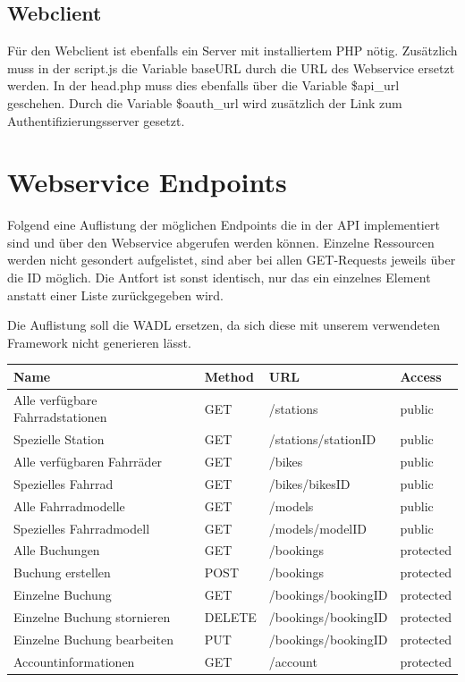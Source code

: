 \section{Webclient}
Für den Webclient ist ebenfalls ein Server mit installiertem PHP nötig. Zusätzlich muss in der script.js die Variable baseURL durch die URL des Webservice ersetzt werden. In der head.php muss dies ebenfalls über die Variable \$api\_url geschehen. Durch die Variable \$oauth\_url wird zusätzlich der Link zum Authentifizierungsserver gesetzt.

\chapter{Webservice Endpoints}

Folgend eine Auflistung der möglichen Endpoints die in der API implementiert sind und über den Webservice abgerufen werden können. Einzelne Ressourcen werden nicht gesondert aufgelistet, sind aber bei allen GET-Requests jeweils über die ID möglich. Die Antfort ist sonst identisch, nur das ein einzelnes Element anstatt einer Liste zurückgegeben wird.

Die Auflistung soll die WADL ersetzen, da sich diese mit unserem verwendeten Framework nicht generieren lässt.

\begin{tabularx}{\columnwidth}{|X|p{1.5cm}|X|p{1.5cm}|}
	\hline
	Name & Method & URL & Access \\
	\hline
	\hline
	Alle verfügbare Fahrradstationen & GET & /stations & public \\
	\hline
	Spezielle Station & GET & /stations/stationID & public \\
	\hline
	Alle verfügbaren Fahrräder & GET & /bikes & public \\
	\hline
	Spezielles Fahrrad & GET & /bikes/bikesID & public \\
	\hline
	Alle Fahrradmodelle & GET & /models & public \\
	\hline
	Spezielles Fahrradmodell & GET & /models/modelID & public \\
	\hline
	Alle Buchungen & GET & /bookings & protected \\
	\hline
	Buchung erstellen & POST & /bookings & protected \\
	\hline
	Einzelne Buchung & GET & /bookings/bookingID & protected \\
	\hline
	Einzelne Buchung stornieren & DELETE & /bookings/bookingID & protected \\
	\hline
	Einzelne Buchung bearbeiten & PUT & /bookings/bookingID & protected \\
	\hline
	Accountinformationen & GET & /account & protected \\
	\hline
\end{tabularx}


